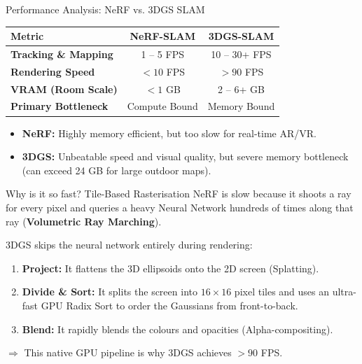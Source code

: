 \documentclass[10pt, aspectratio=169, xcolor={dvipsnames}]{beamer}
\begin{document}
\begin{frame}{Performance Analysis: NeRF vs. 3DGS SLAM}
  \begin{table}
    \centering
    \renewcommand{\arraystretch}{1.4}
    \begin{tabular}{l c c}
      \toprule
      \textbf{Metric} & \textbf{NeRF-SLAM} & \textbf{3DGS-SLAM} \\
      \midrule
      \textbf{Tracking \& Mapping} & 1 -- 5 FPS & 10 -- 30+ FPS \\
      \textbf{Rendering Speed} & $< 10$ FPS & $> 90$ FPS \\
      \textbf{VRAM (Room Scale)} & $< 1$ GB & 2 -- 6+ GB \\
      \textbf{Primary Bottleneck} & Compute Bound & Memory Bound \\
      \bottomrule
    \end{tabular}
  \end{table}
  \vspace{0.5em}
  \begin{itemize}
    \item \textbf{NeRF:} Highly memory efficient, but too slow for real-time AR/VR.
    \item \textbf{3DGS:} Unbeatable speed and visual quality, but severe memory bottleneck (can exceed 24 GB for large outdoor maps).
  \end{itemize}
\end{frame}


\begin{frame}{Why is it so fast? Tile-Based Rasterisation}
  NeRF is slow because it shoots a ray for every pixel and queries a heavy Neural Network hundreds of times along that ray (\textbf{Volumetric Ray Marching}).
  
  \vspace{1em}
  3DGS skips the neural network entirely during rendering:
  \begin{enumerate}
    \item \textbf{Project:} It flattens the 3D ellipsoids onto the 2D screen (Splatting).
    \item \textbf{Divide \& Sort:} It splits the screen into $16 \times 16$ pixel tiles and uses an ultra-fast GPU Radix Sort to order the Gaussians from front-to-back.
    \item \textbf{Blend:} It rapidly blends the colours and opacities (Alpha-compositing).
  \end{enumerate}
  
  \vspace{0.5em}
  \centering \alert{$\Rightarrow$ This native GPU pipeline is why 3DGS achieves $>90$ FPS.}
\end{frame}
\end{document}
